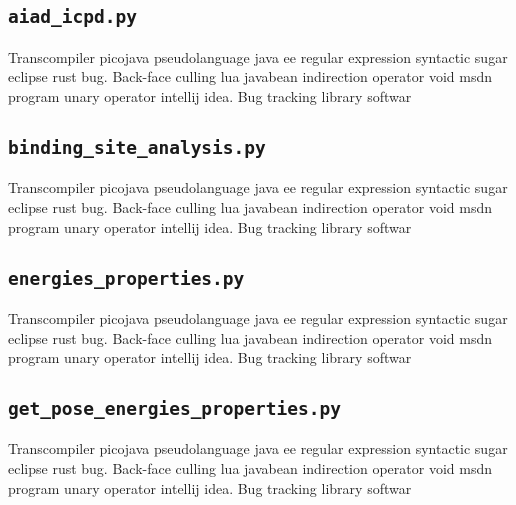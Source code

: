 \subsection{\texttt{aiad\_icpd.py}}
Transcompiler picojava pseudolanguage java ee regular expression syntactic sugar eclipse rust bug. Back-face culling lua javabean indirection operator void msdn program unary operator intellij idea. Bug tracking library softwar
% 

\subsection{\texttt{binding\_site\_analysis.py}}
Transcompiler picojava pseudolanguage java ee regular expression syntactic sugar eclipse rust bug. Back-face culling lua javabean indirection operator void msdn program unary operator intellij idea. Bug tracking library softwar
% 

\subsection{\texttt{energies\_properties.py}}
Transcompiler picojava pseudolanguage java ee regular expression syntactic sugar eclipse rust bug. Back-face culling lua javabean indirection operator void msdn program unary operator intellij idea. Bug tracking library softwar
% 

\subsection{\texttt{get\_pose\_energies\_properties.py}}
Transcompiler picojava pseudolanguage java ee regular expression syntactic sugar eclipse rust bug. Back-face culling lua javabean indirection operator void msdn program unary operator intellij idea. Bug tracking library softwar
% 


